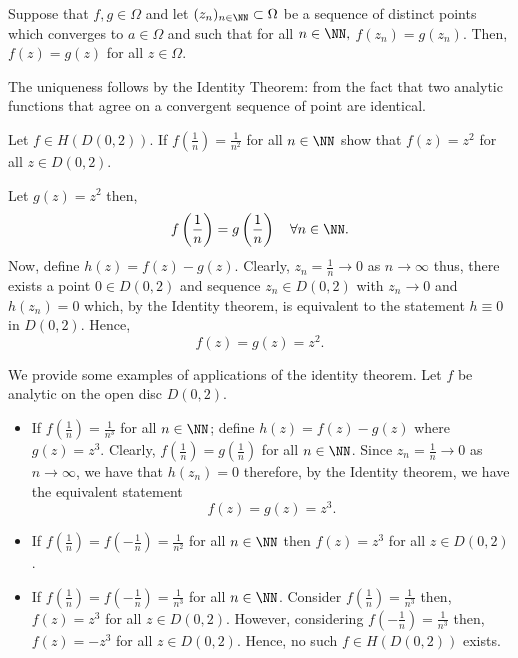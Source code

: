 \documentclass[12pt, a4paper]{article}
\begin{document}
\begin{corollary}
    Suppose that \(f,g \in \Omega\) and let \((z_n)_{n \in \NN} \subset \Omega\) be a sequence of distinct points which converges to \(a \in \Omega\) and such that for all \(n \in \NN,\) \(f(z_n) = g(z_n)\). Then, \(f(z)=g(z)\) for all \(z \in \Omega\).
\end{corollary}

\begin{mdnote}
    The uniqueness follows by the Identity Theorem: from the fact that two analytic functions that agree on a convergent sequence of point are identical.
\end{mdnote}

\begin{mdexample}
    Let \(f \in H(D(0,2))\). If \(f\left( \frac{1}{n} \right) = \frac{1}{n^2}\) for all \(n \in \NN\) show that \(f(z)=z^2\) for all \(z \in D(0,2)\).
    \begin{solution}
        Let \(g(z)=z^2\) then, 
        \[f \left( \frac{1}{n} \right) = g \left( \frac{1}{n} \right) \quad \forall n \in \NN.\]
        Now, define \(h(z) = f(z)-g(z)\). Clearly, \(z_n = \frac{1}{n} \to 0\) as \(n\to \infty\) thus, there exists a point \(0 \in D(0,2)\) and sequence \(z_n \in D(0,2)\) with \(z_n \to 0\) and \(h(z_n)=0\) which, by the Identity theorem, is equivalent to the statement \(h \equiv 0\) in \(D(0,2)\). Hence,
        \[f(z) = g(z) = z^2.\]
    \end{solution}
\end{mdexample}

\begin{example}
    We provide some examples of applications of the identity theorem. Let \(f\) be analytic on the open disc \(D(0,2)\). 
    \begin{itemize}
        \item If \(f\left( \frac{1}{n} \right) = \frac{1}{n^3}\) for all \(n \in \NN\); define \(h(z) = f(z)- g(z)\) where \(g(z)=z^3\). Clearly, \(f\left( \frac{1}{n} \right) = g\left( \frac{1}{n} \right)\) for all \(n \in \NN\). Since \(z_n = \frac{1}{n} \to 0\) as \(n \to \infty\), we have that \(h(z_n)=0\) therefore, by the Identity theorem, we have the equivalent statement 
        \[f(z)=g(z)=z^3.\]
        \item If \(f\left( \frac{1}{n} \right)=f\left( -\frac{1}{n} \right)=\frac{1}{n^2}\) for all \(n \in \NN\) then \(f(z)=z^3\) for all \(z \in D(0,2)\).
        \item If \(f\left( \frac{1}{n} \right)= f\left( -\frac{1}{n} \right)=\frac{1}{n^3}\) for all \(n \in \NN\). Consider \(f\left( \frac{1}{n} \right) = \frac{1}{n^3}\) then, \(f(z)=z^3\) for all \(z \in D(0,2)\). However, considering \(f\left( -\frac{1}{n} \right) = \frac{1}{n^3}\) then, \(f(z)=-z^3\) for all \(z \in D(0,2)\). Hence, no such \(f \in H(D(0,2))\) exists.
    \end{itemize}
\end{example}
\end{document}

